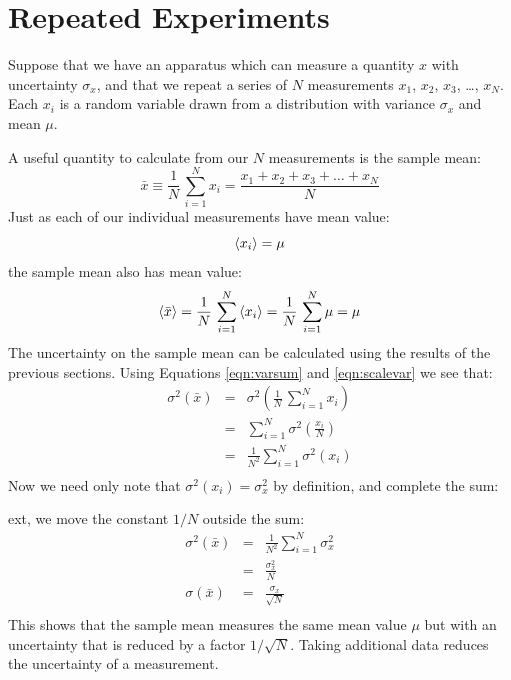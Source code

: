 \documentclass[12pt,oneside]{book}
\begin{document}
\section{Repeated Experiments}

Suppose that we have an apparatus which can measure a quantity $x$
with uncertainty $\sigma_x$, and that we repeat a series of $N$
measurements $x_1$, $x_2$, $x_3$, \ldots, $x_N$. Each $x_i$ is a
random variable drawn from a distribution with variance $\sigma_x$ and
mean $\mu$.

A useful quantity to calculate from our $N$ measurements is the sample mean:
\begin{displaymath}
  \bar{x} \equiv \frac{1}{N} \, \sum_{i=1}^{N} x_i = \frac{x_1 + x_2 + x_3 + \ldots + x_N}{N}
\end{displaymath}
Just as each of our individual measurements have mean value:
\begin{displaymath}
\braket{x_i} = \mu  
\end{displaymath}
the sample mean also has mean value:
\begin{displaymath}
  \braket{\bar{x}} = \frac{1}{N} \, \sum_{i=1}^{N} \braket{x_i}
= \frac{1}{N} \, \sum_{i=1}^{N} \mu = \mu
\end{displaymath}
The uncertainty on the sample mean can be calculated using the results of the previous sections.  Using Equations \ref{eqn:varsum} and \ref{eqn:scalevar} we see that:
\begin{eqnarray*}
  \sigma^2(\bar{x}) &=& \sigma^2\left( \frac{1}{N} \, \sum_{i=1}^{N} x_i \right) \\
  &=& \sum_{i=1}^{N} \sigma^2 \left( \frac{x_i}{N} \right) \\
  &=& \frac{1}{N^2}\sum_{i=1}^{N} \sigma^2 \left( x_i \right) \\
\end{eqnarray*}
Now we need only note that $\sigma^2(x_i) = \sigma^2_x$ by definition, and complete the sum:

ext, we move the constant $1/N$ outside the sum:
\begin{eqnarray*}
\sigma^2(\bar{x}) &=& \frac{1}{N^2}\sum_{i=1}^{N} \sigma^2_x \\
  &=& \frac{\sigma_x^2}{N} \\
 \sigma(\bar{x}) &=& \frac{\sigma_x}{\sqrt{N}} \\
\end{eqnarray*}
This shows that the sample mean measures the same mean value $\mu$ but
with an uncertainty that is reduced by a factor $1/\sqrt{N}$.  Taking
additional data reduces the uncertainty of a measurement.
\end{document}
